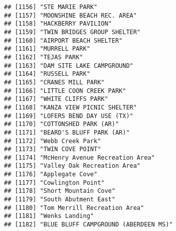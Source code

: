 \documentclass[
]{article}
\begin{document}
\begin{verbatim}
## [1156] "STE MARIE PARK"                                                                      
## [1157] "MOONSHINE BEACH REC. AREA"                                                           
## [1158] "HACKBERRY PAVILION"                                                                  
## [1159] "TWIN BRIDGES GROUP SHELTER"                                                          
## [1160] "AIRPORT BEACH SHELTER"                                                               
## [1161] "MURRELL PARK"                                                                        
## [1162] "TEJAS PARK"                                                                          
## [1163] "DAM SITE LAKE CAMPGROUND"                                                            
## [1164] "RUSSELL PARK"                                                                        
## [1165] "CRANES MILL PARK"                                                                    
## [1166] "LITTLE COON CREEK PARK"                                                              
## [1167] "WHITE CLIFFS PARK"                                                                   
## [1168] "KANZA VIEW PICNIC SHELTER"                                                           
## [1169] "LOFERS BEND DAY USE (TX)"                                                            
## [1170] "COTTONSHED PARK (AR)"                                                                
## [1171] "BEARD'S BLUFF PARK (AR)"                                                             
## [1172] "Webb Creek Park"                                                                     
## [1173] "TWIN COVE POINT"                                                                     
## [1174] "McHenry Avenue Recreation Area"                                                      
## [1175] "Valley Oak Recreation Area"                                                          
## [1176] "Applegate Cove"                                                                      
## [1177] "Cowlington Point"                                                                    
## [1178] "Short Mountain Cove"                                                                 
## [1179] "South Abutment East"                                                                 
## [1180] "Tom Merrill Recreation Area"                                                         
## [1181] "Wenks Landing"                                                                       
## [1182] "BLUE BLUFF CAMPGROUND (ABERDEEN MS)"                                                 

\end{verbatim}
\end{document}
